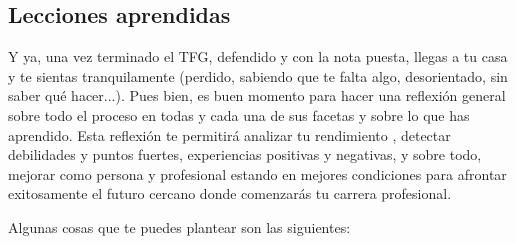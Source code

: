 {%
\subsection{Lecciones aprendidas}

Y ya, una vez terminado el TFG, defendido y con la nota puesta, llegas a tu casa y te sientas tranquilamente (perdido, sabiendo que te falta algo, desorientado, sin saber qué hacer...). Pues bien, es buen momento para hacer una reflexión general sobre todo el proceso en todas y cada una de sus facetas y sobre lo que has aprendido. Esta reflexión te permitirá analizar tu rendimiento , detectar debilidades y puntos fuertes, experiencias positivas y negativas, y sobre todo, mejorar como persona y profesional estando en mejores condiciones para afrontar exitosamente el futuro cercano donde comenzarás tu carrera profesional.

Algunas cosas que te puedes plantear son las siguientes:

}
